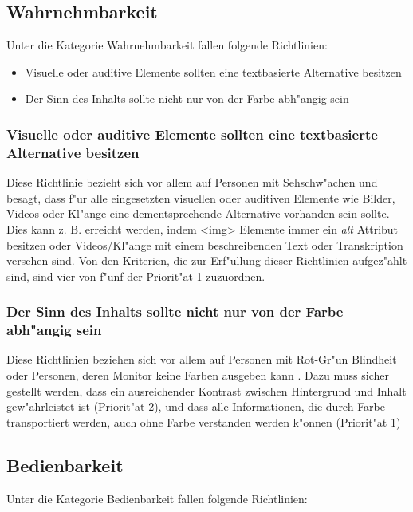 \documentclass[a4paper,bibtotoc,oneside]{scrbook}
\begin{document}
\subsection{Wahrnehmbarkeit}
Unter die Kategorie Wahrnehmbarkeit fallen folgende Richtlinien: 

\begin{itemize}
\item Visuelle oder auditive Elemente sollten eine textbasierte Alternative besitzen\cite[Abschnitt 6.1]{wcag1}
\item Der Sinn des Inhalts sollte nicht nur von der Farbe abh"angig sein \cite[Abschnitt 6.2]{wcag1}
\end{itemize}

\subsubsection{Visuelle oder auditive Elemente sollten eine textbasierte Alternative besitzen}
Diese Richtlinie bezieht sich vor allem auf Personen mit Sehschw"achen und besagt, dass f"ur alle eingesetzten visuellen oder auditiven Elemente wie Bilder, Videos oder Kl"ange eine dementsprechende Alternative vorhanden sein sollte. Dies kann z. B. erreicht werden, indem <img> Elemente immer ein \emph{alt} Attribut besitzen oder Videos/Kl"ange mit einem beschreibenden Text oder Transkription versehen sind. Von den Kriterien, die  zur Erf"ullung dieser Richtlinien aufgez"ahlt sind, sind vier von f"unf der Priorit"at 1 zuzuordnen. \cite[Abschnitt 6.1]{wcag1}

\subsubsection{Der Sinn des Inhalts sollte nicht nur von der Farbe abh"angig sein}
Diese Richtlinien beziehen sich vor allem auf Personen mit Rot-Gr"un Blindheit oder Personen, deren Monitor keine Farben ausgeben kann \cite[S. 41]{barr_webd}. Dazu muss sicher gestellt werden, dass ein ausreichender Kontrast zwischen Hintergrund und Inhalt gew"ahrleistet ist (Priorit"at 2), und dass alle Informationen, die durch Farbe transportiert werden, auch ohne Farbe verstanden werden k"onnen (Priorit"at 1) \cite[Abschnitt 6.1]{wcag1}


\subsection{Bedienbarkeit}
Unter die Kategorie Bedienbarkeit fallen folgende Richtlinien: 
\end{document}
